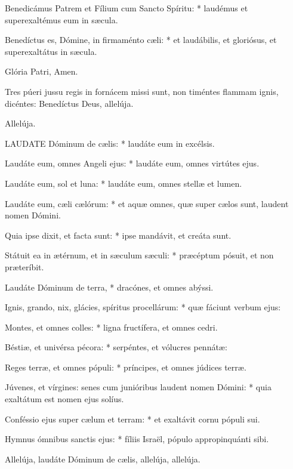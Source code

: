 Benedicámus Patrem et Fílium cum Sancto Spíritu: * laudémus et superexaltémus eum in sæcula.

Benedíctus es, Dómine, in firmaménto cæli: * et laudábilis, et gloriósus, et superexaltátus in sæcula.

 Glória Patri,  Amen.

 Tres púeri jussu regis in fornácem missi sunt, non timéntes flammam ignis, dicéntes: Benedíctus Deus, allelúja.

 Allelúja.


\lettrine[lines=2]{L}{AUDATE} Dóminum de cælis: * laudáte eum in excélsis.

Laudáte eum, omnes Angeli ejus: * laudáte eum, omnes virtútes ejus.

Laudáte eum, sol et luna: * laudáte eum, omnes stellæ et lumen.

Laudáte eum, cæli cælórum: * et aquæ omnes, quæ super cælos sunt, laudent nomen Dómini.

Quia ipse dixit, et facta sunt: * ipse mandávit, et creáta sunt.

Státuit ea in ætérnum, et in sæculum sæculi: * præcéptum pósuit, et non præteríbit.

Laudáte Dóminum de terra, * dracónes, et omnes abýssi.

Ignis, grando, nix, glácies, spíritus procellárum: * quæ fáciunt verbum ejus:

Montes, et omnes colles: * ligna fructífera, et omnes cedri.

Béstiæ, et univérsa pécora: * serpéntes, et vólucres pennátæ:

Reges terræ, et omnes pópuli: * príncipes, et omnes júdices terræ.

Júvenes, et vírgines: senes cum junióribus laudent nomen Dómini: * quia exaltátum est nomen ejus solíus.

Conféssio ejus super cælum et terram: * et exaltávit cornu pópuli sui.

Hymnus ómnibus sanctis ejus: * fíliis Israël, pópulo appropinquánti sibi.

 Allelúja, laudáte Dóminum de cælis, allelúja, allelúja.



